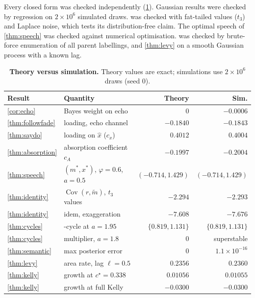 \documentclass[10pt,twocolumn,letterpaper]{article}
\theoremstyle{plain}
\theoremstyle{definition}
\theoremstyle{remark}
\DeclareMathOperator{\Cov}{Cov}
\begin{document}
Every closed form was checked independently (\cref{tab:verify}). Gaussian results were checked by regression on $2\times10^6$ simulated draws.  was checked with fat-tailed values ($t_3$) and Laplace noise, which tests its distribution-free claim. The optimal speech of \cref{thm:speech} was checked against numerical optimisation.  was checked by brute-force enumeration of all parent labellings, and \cref{thm:levy} on a smooth Gaussian process with a known lag.

\begin{table}[t]
\centering
\caption{\textbf{Theory versus simulation.} Theory values are exact; simulations use $2\times10^6$ draws (seed 0).}
\label{tab:verify}
\footnotesize
\setlength{\tabcolsep}{3.5pt}
\begin{tabularx}{\columnwidth}{@{}l>{\raggedright\arraybackslash}Xrr@{}}
\toprule
\textsf{Result} & \textsf{Quantity} & \textsf{Theory} & \textsf{Sim.} \\
\midrule
\cref{cor:echo} & Bayes weight on echo & $0$ & $-0.0006$ \\
\cref{thm:followfade} & loading, echo channel & $-0.1840$ & $-0.1843$ \\
\cref{thm:saydo} & loading on $\hat x$ ($c_x$) & $0.4012$ & $0.4004$ \\
\cref{thm:absorption} & absorption coefficient $c_A$ & $-0.1997$ & $-0.2004$ \\
\cref{thm:speech} & $(m^\ast,x^\ast)$, $\varphi{=}0.6$, $a{=}0.5$ & $(-0.714, 1.429)$ & $(-0.714, 1.429)$ \\
\cref{thm:identity} & $\Cov(r,\tilde m)$, $t_3$ values & $-2.294$ & $-2.293$ \\
\cref{thm:identity} & idem, exaggeration & $-7.608$ & $-7.676$ \\
\cref{thm:cycles} & 2-cycle at $a{=}1.95$ & $\{0.819, 1.131\}$ & $\{0.819, 1.131\}$ \\
\cref{thm:cycles} & multiplier, $a{=}1.8$ & $0$ & superstable \\
\cref{thm:semantic} & max posterior error & $0$ & $1.1{\times}10^{-16}$ \\
\cref{thm:levy} & area rate, lag $\ell=0.5$ & $0.2356$ & $0.2360$ \\
\cref{thm:kelly} & growth at $c^\star=0.338$ & $0.01056$ & $0.01055$ \\
\cref{thm:kelly} & growth at full Kelly & $-0.0300$ & $-0.0300$ \\
\bottomrule
\end{tabularx}
\end{table}
\end{document}
